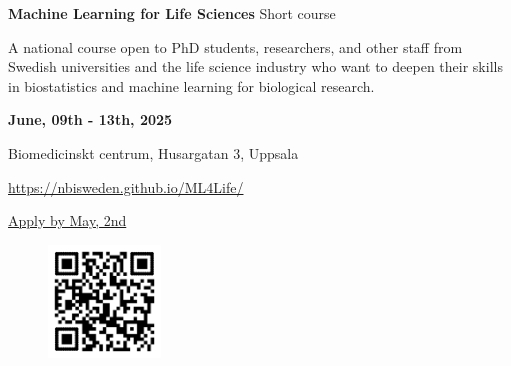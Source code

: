 \documentclass[12pt]{article}\usepackage[]{graphicx}\usepackage[]{color}
\begin{document}

\Huge
\textbf{Machine Learning for Life Sciences} %
\Large
\newline
Short course

\vspace{1cm}
\Large
A national course open to PhD students, researchers, and other staff from Swedish universities and the life science industry who want to deepen their skills in biostatistics and machine learning for biological research.

\LARGE
\vspace{0.5cm}
\textbf{June, 09th - 13th, 2025} %

\large
Biomedicinskt centrum,  Husargatan 3, Uppsala %



\Large

\href{https://nbisweden.github.io/ML4Life/}{https://nbisweden.github.io/ML4Life/}


\Large
 \href{https://nbisweden.github.io/ML4Life/}{Apply by May, 2nd}

\begin{figure}[H]
 \begin{minipage}[c]{0.6\linewidth}
 \end{minipage}\hfill
 \begin{minipage}[c]{0.2\linewidth}
 \includegraphics[width=3cm, height=3cm, center]{QR-code.png}
 \end{minipage}
  
\end{figure}
\end{document}
